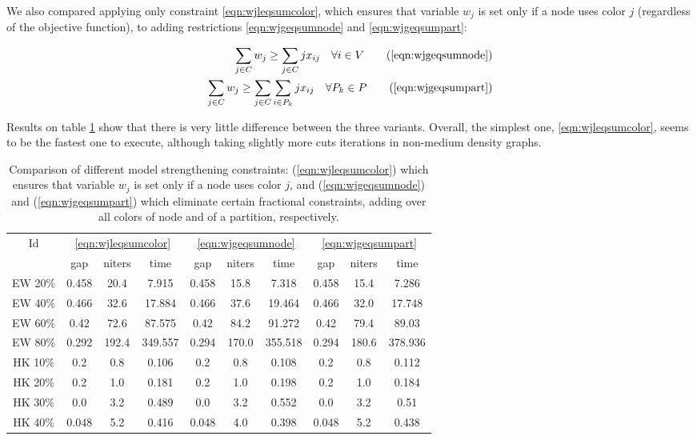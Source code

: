 We also compared applying only constraint \ref{eqn:wjleqsumcolor}, which ensures that variable $w_j$ is set only if a node uses color $j$ (regardless of the objective function), to adding restrictions \ref{eqn:wjgeqsumnode} and \ref{eqn:wjgeqsumpart}:

\begin{align*}
\sum_{j \in C} w_j \geq \sum_{j \in C} j x_{ij} \quad \forall i \in V \tag{\ref{eqn:wjgeqsumnode}} \\
\sum_{j \in C} w_j \geq \sum_{j \in C} \sum_{i \in P_k} j x_{ij} \quad \forall P_k \in P \tag{\ref{eqn:wjgeqsumpart}}
\end{align*}

Results on table \ref{table:models:colorbound} show that there is very little difference between the three variants. Overall, the simplest one, \ref{eqn:wjleqsumcolor}, seems to be the fastest one to execute, although taking slightly more cuts iterations in non-medium density graphs.

\begin{table}
\label{table:models:colorbound}
\centering

\begin{tabular}{|c|ccc|ccc|ccc|}
\hline
\multicolumn{1}{|c|}{Id} & \multicolumn{3}{|c|}{\ref{eqn:wjleqsumcolor}} & \multicolumn{3}{|c|}{\ref{eqn:wjgeqsumnode}} & \multicolumn{3}{|c|}{\ref{eqn:wjgeqsumpart}}
\\
 & gap & niters & time & gap & niters & time & gap & niters & time
\\
\hline
EW 20\% & 0.458 & 20.4 & 7.915 & 0.458 & 15.8 & 7.318 & 0.458 & 15.4 & 7.286
\\
EW 40\% & 0.466 & 32.6 & 17.884 & 0.466 & 37.6 & 19.464 & 0.466 & 32.0 & 17.748
\\
EW 60\% & 0.42 & 72.6 & 87.575 & 0.42 & 84.2 & 91.272 & 0.42 & 79.4 & 89.03
\\
EW 80\% & 0.292 & 192.4 & 349.557 & 0.294 & 170.0 & 355.518 & 0.294 & 180.6 & 378.936
\\
\hline
HK 10\% &  0.2 &  0.8 & 0.106 &  0.2 &  0.8 & 0.108 &  0.2 &  0.8 & 0.112
\\
HK 20\% &  0.2 &  1.0 & 0.181 &  0.2 &  1.0 & 0.198 &  0.2 &  1.0 & 0.184
\\
HK 30\% &  0.0 &  3.2 & 0.489 &  0.0 &  3.2 & 0.552 &  0.0 &  3.2 & 0.51
\\
HK 40\% & 0.048 &  5.2 & 0.416 & 0.048 &  4.0 & 0.398 & 0.048 &  5.2 & 0.438
\\
\hline 
 \end{tabular}

\caption{Comparison of different model strengthening constraints: (\ref{eqn:wjleqsumcolor}) which ensures that variable $w_j$ is set only if a node uses color $j$, and (\ref{eqn:wjgeqsumnode}) and (\ref{eqn:wjgeqsumpart}) which eliminate certain fractional constraints, adding over all colors of node and of a partition, respectively.}

\end{table}


